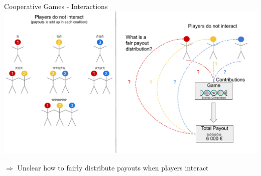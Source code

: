 \documentclass[10pt,compress,t,notes=noshow, xcolor=table]{beamer}
\begin{document}



\begin{frame}{Cooperative Games - Interactions}
\includegraphics[page=3, width = \textwidth]{figure/Shapley.pdf}

\centering 
$\Rightarrow$ Unclear how to fairly distribute payouts when players interact
\end{frame}
\end{document}
